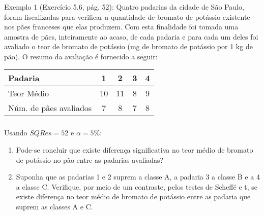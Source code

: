 \documentclass[14pt,aspectratio=1610]{beamer}
\begin{document}
\begin{frame}{}
\frametitle{}
\begin{block}{Exemplo 1 (Exercício 5.6, pág. 52):}
\justifying
Quatro padarias da cidade de São Paulo, foram fiscalizadas para verificar a quantidade de bromato de potássio existente nos pães 
franceses que elas produzem. Com esta finalidade foi tomada uma amostra de pães, inteiramente ao acaso, de cada padaria e para cada um deles foi avaliado o teor 
de bromato de potássio (mg de bromato de potássio por 1 kg de pão). O resumo da avaliação é fornecido a seguir:
\begin{table}[h]
\begin{tabular}{lcccc}
\hline
Padaria &1&2&3&4\\
\hline
Teor Médio &10&11&8&9\\
\hline
Núm. de pães avaliados&7&8&7&8\\
\hline
\end{tabular}
\end{table}
\end{block}
\end{frame}

\begin{frame}{}
\frametitle{}
\begin{block}{}
\justifying
Usando $SQRes = 52$ e $\alpha = 5\%$:
\begin{enumerate}
\item Pode-se concluir que existe diferença significativa no teor médio de bromato de potássio no pão entre as padarias avaliadas?
\item Suponha que as padarias 1 e 2 suprem a classe A, a padaria 3 a classe B e a 4 a classe C. Verifique, por meio de um contraste, pelos testes de Scheffé e t, se existe diferença no teor médio de bromato de potássio entre as padaria que suprem as classes A e C.
\end{enumerate}

\end{block}
\end{frame}
\end{document}
